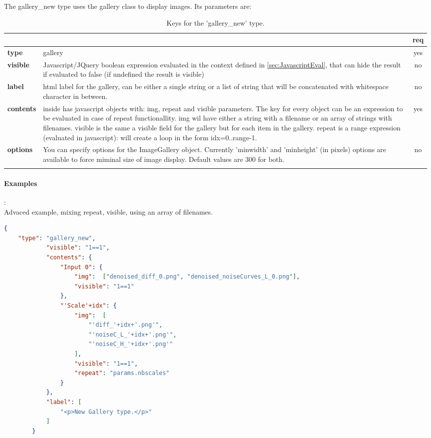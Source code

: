 The gallery\_new type uses the gallery class to display images. Its parameters are:

\begin{longtable}{|>{\bf}L{\linewidth}|L{\linewidth}|c|}
\hline
      &  & {\bf req} 
\tabularnewline \hline \hline
 type       & gallery  & yes \\ \hline
 visible    & Javascript/JQuery boolean expression evaluated in the context 
              defined in \ref{sec:JavascriptEval}, that can hide the result if
              evaluated to false (if undefined the result is visible)& no \\ \hline
 label      & html label for the gallery, can be either a single string or 
             a list of string that will be concatenated with whitespace character
              in between. & no \\ \hline
 contents   & inside has javascript objects with: img, repeat and visible parameters.
 				The key for every object can be an expression to be evaluated in case of repeat
 				functionallity.
 			    img wil have either a string with a filename or an array of strings with filenames.
 			    visible is the same a visible field for the gallery but for each item in the gallery.
 			    repeat is a range expression (evaluated in javascript): will create a loop in the 
 			    form idx=0..range-1.
            & yes \\ \hline
 options    & You can specify options for the ImageGallery object. Currently
              'minwidth' and 'minheight' (in pixels) options are available to force
              miminal size of image display. Default values are 300 for both.& no \\ \hline
\caption{Keys for the 'gallery\_new' type.}
\end{longtable}

\paragraph{Examples}:\\
Advaced example, mixing repeat, visible, using an array of filenames.
\begin{lstlisting}[language=json,firstnumber=1]
{
  	"type": "gallery_new",
            "visible": "1==1",
            "contents": {
                "Input 0": {
                    "img":  ["denoised_diff_0.png", "denoised_noiseCurves_L_0.png"],
                    "visible": "1==1"
                },
                "'Scale'+idx": {
                    "img":  [
                        "'diff_'+idx+'.png'", 
                        "'noiseC_L_'+idx+'.png'", 
                        "'noiseC_H_'+idx+'.png'"
                    ],
                    "visible": "1==1",
                    "repeat": "params.nbscales"
                }
            },
            "label": [
                "<p>New Gallery type.</p>"
            ]
        }
\end{lstlisting}



